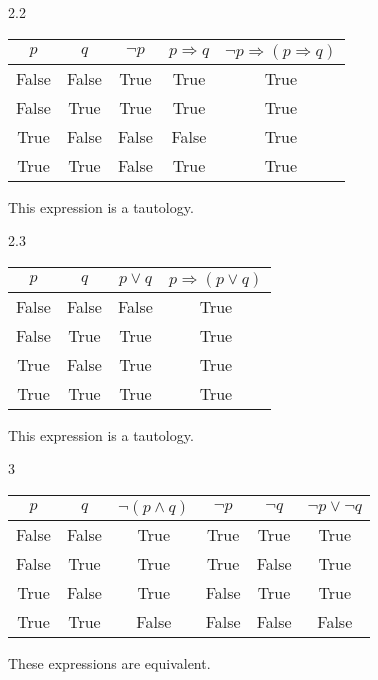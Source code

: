 \documentclass{article}
\begin{document}
2.2
\begin{center}
    \begin{tabular}{c c|c|c||c}
         $p$ & $q$ & \( \neg p \) & \( p \Longrightarrow q \) & \( \neg p \Longrightarrow (p \Longrightarrow q) \) \\
         \hline
         False & False & True & True & True \\
         False & True & True & True & True \\
         True & False & False & False & True \\
         True & True & False & True & True \\
    \end{tabular}
\end{center}
\begin{center} This expression is a tautology. \end{center}

2.3
\begin{center}
    \begin{tabular}{c c|c||c}
         $p$ & $q$ & \( p \vee q \) & \( p \Longrightarrow (p \vee q) \) \\
         \hline
         False & False & False & True \\
         False & True & True & True \\
         True & False & True & True \\
         True & True & True & True \\
    \end{tabular}
    This expression is a tautology.
\end{center}

\vspace{10mm}
3
\begin{center}
    \begin{tabular}{c c|c||c c|c}
         $p$ & $q$ & \( \neg (p \land q) \) & $\neg p$ & $\neg q$ & \( \neg p \vee \neg q \) \\
         \hline
         False & False & True & True & True & True \\
         False & True & True & True & False & True \\
         True & False & True & False & True & True \\
         True & True & False & False & False & False \\
    \end{tabular}
\end{center}
\begin{center} These expressions are equivalent. \end{center}
\end{document}
